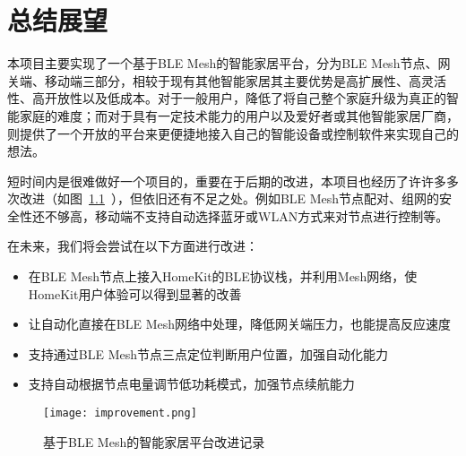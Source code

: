 \chapter{总结展望}
本项目主要实现了一个基于BLE Mesh的智能家居平台，分为BLE Mesh节点、网关端、移动端三部分，相较于现有其他智能家居其主要优势是高扩展性、高灵活性、高开放性以及低成本。对于一般用户，降低了将自己整个家庭升级为真正的智能家庭的难度；而对于具有一定技术能力的用户以及爱好者或其他智能家居厂商，则提供了一个开放的平台来更便捷地接入自己的智能设备或控制软件来实现自己的想法。

短时间内是很难做好一个项目的，重要在于后期的改进，本项目也经历了许许多多次改进（如图~\ref{fig:improvement}~），但依旧还有不足之处。例如BLE Mesh节点配对、组网的安全性还不够高，移动端不支持自动选择蓝牙或WLAN方式来对节点进行控制等。

在未来，我们将会尝试在以下方面进行改进：
\begin{itemize}
    \item 在BLE Mesh节点上接入HomeKit的BLE协议栈，并利用Mesh网络，使HomeKit用户体验可以得到显著的改善
    \item 让自动化直接在BLE Mesh网络中处理，降低网关端压力，也能提高反应速度
    \item 支持通过BLE Mesh节点三点定位判断用户位置，加强自动化能力
    \item 支持自动根据节点电量调节低功耗模式，加强节点续航能力
\end{itemize}

\begin{figure}[H]
    \centering
    \texttt{[image: improvement.png]}
    \caption{基于BLE Mesh的智能家居平台改进记录}
    \label{fig:improvement}
\end{figure}